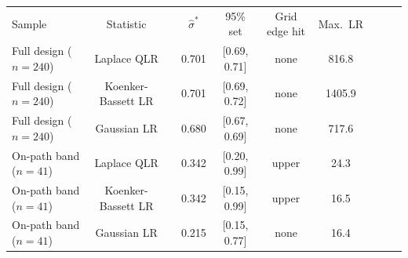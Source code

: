 \begin{table}[tp]
\begin{tabular*}{\textwidth}{@{\extracolsep{\fill}}lccccccccc@{}}
Sample & Statistic & & $\hat\sigma^*$ & 95\% set & Grid edge hit & Max.\ LR & & & \\
Full design ($n=240$) & Laplace QLR & & 0.701 & [0.69, 0.71] & none & 816.8 & & & \\
Full design ($n=240$) & Koenker-Bassett LR & & 0.701 & [0.69, 0.72] & none & 1405.9 & & & \\
Full design ($n=240$) & Gaussian LR & & 0.680 & [0.67, 0.69] & none & 717.6 & & & \\
On-path band ($n=41$) & Laplace QLR & & 0.342 & [0.20, 0.99] & upper & 24.3 & & & \\
On-path band ($n=41$) & Koenker-Bassett LR & & 0.342 & [0.15, 0.99] & upper & 16.5 & & & \\
On-path band ($n=41$) & Gaussian LR & & 0.215 & [0.15, 0.77] & none & 16.4 & & & \\
\bottomrule
\end{tabular*}


\end{table}
